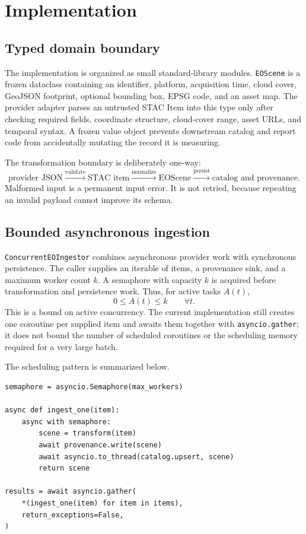 \chapter{Implementation}

\section{Typed domain boundary}

The implementation is organized as small standard-library modules. \texttt{EOScene} is a frozen
dataclass containing an identifier, platform, acquisition time, cloud cover, GeoJSON footprint,
optional bounding box, EPSG code, and an asset map. The provider adapter parses an untrusted STAC
Item into this type only after checking required fields, coordinate structure, cloud-cover range,
asset URLs, and temporal syntax. A frozen value object prevents downstream catalog and report code
from accidentally mutating the record it is measuring.

The transformation boundary is deliberately one-way:
\[
\text{provider JSON}\xrightarrow{\text{validate}}\text{STAC item}
\xrightarrow{\text{normalize}}\text{EOScene}
\xrightarrow{\text{persist}}\text{catalog and provenance}.
\]
Malformed input is a permanent input error. It is not retried, because repeating an invalid payload
cannot improve its schema.

\section{Bounded asynchronous ingestion}

\texttt{ConcurrentEOIngestor} combines asynchronous provider work with synchronous persistence.
The caller supplies an iterable of items, a provenance sink, and a maximum worker count \(k\).
A semaphore with capacity \(k\) is acquired before transformation and persistence work. Thus,
for active tasks
\(A(t)\),
\[
0\leq A(t)\leq k\qquad\forall t.
\]
This is a bound on active concurrency. The current implementation still creates one coroutine
per supplied item and awaits them together with \texttt{asyncio.gather}; it does not bound the
number of scheduled coroutines or the scheduling memory required for a very large batch.

The scheduling pattern is summarized below.

\begin{verbatim}
semaphore = asyncio.Semaphore(max_workers)

async def ingest_one(item):
    async with semaphore:
        scene = transform(item)
        await provenance.write(scene)
        await asyncio.to_thread(catalog.upsert, scene)
        return scene

results = await asyncio.gather(
    *(ingest_one(item) for item in items),
    return_exceptions=False,
)
\end{verbatim}

